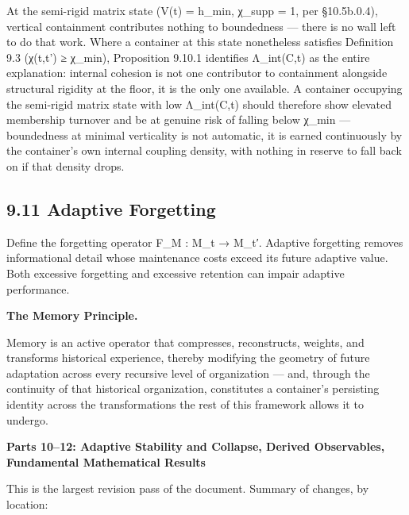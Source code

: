 \documentclass[
]{article}
\begin{document}
At the semi-rigid matrix state (V(t) = h\_min, χ\_supp = 1, per
§10.5b.0.4), vertical containment contributes nothing to boundedness ---
there is no wall left to do that work. Where a container at this state
nonetheless satisfies Definition 9.3 (χ(t,t') ≥ χ\_min), Proposition
9.10.1 identifies Λ\_int(C,t) as the entire explanation: internal
cohesion is not one contributor to containment alongside structural
rigidity at the floor, it is the only one available. A container
occupying the semi-rigid matrix state with low Λ\_int(C,t) should
therefore show elevated membership turnover and be at genuine risk of
falling below χ\_min --- boundedness at minimal verticality is not
automatic, it is earned continuously by the container's own internal
coupling density, with nothing in reserve to fall back on if that
density drops.

\hypertarget{adaptive-forgetting}{%
\subsection{9.11 Adaptive Forgetting}\label{adaptive-forgetting}}

Define the forgetting operator F\_M : M\_t → M\_t′. Adaptive forgetting
removes informational detail whose maintenance costs exceed its future
adaptive value. Both excessive forgetting and excessive retention can
impair adaptive performance.

\textbf{The Memory Principle.}

Memory is an active operator that compresses, reconstructs, weights, and
transforms historical experience, thereby modifying the geometry of
future adaptation across every recursive level of organization --- and,
through the continuity of that historical organization, constitutes a
container's persisting identity across the transformations the rest of
this framework allows it to undergo.

\textbf{Parts 10--12: Adaptive Stability and Collapse, Derived
Observables, Fundamental Mathematical Results}

This is the largest revision pass of the document. Summary of changes,
by location:
\end{document}
